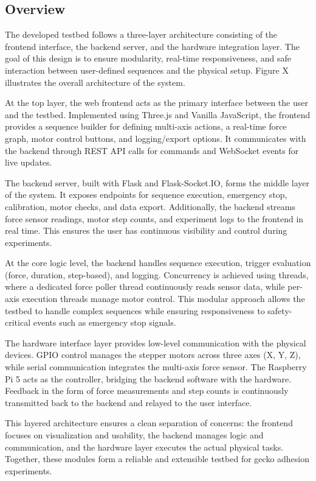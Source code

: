 \documentclass[
    twocolumn,
    fontsize = 10pt,
    parskip = half+,
    headings = small,
    headwidth = text,
    footwidth = text,
]{scrartcl}
\begin{document}
\subsection{Overview}
The developed testbed follows a three-layer architecture consisting of the frontend interface, the backend server, and the hardware integration layer. The goal of this design is to ensure modularity, real-time responsiveness, and safe interaction between user-defined sequences and the physical setup. Figure X illustrates the overall architecture of the system.

At the top layer, the web frontend acts as the primary interface between the user and the testbed. Implemented using Three.js and Vanilla JavaScript, the frontend provides a sequence builder for defining multi-axis actions, a real-time force graph, motor control buttons, and logging/export options. It communicates with the backend through REST API calls for commands and WebSocket events for live updates.

The backend server, built with Flask and Flask-Socket.IO, forms the middle layer of the system. It exposes endpoints for sequence execution, emergency stop, calibration, motor checks, and data export. Additionally, the backend streams force sensor readings, motor step counts, and experiment logs to the frontend in real time. This ensures the user has continuous visibility and control during experiments.

At the core logic level, the backend handles sequence execution, trigger evaluation (force, duration, step-based), and logging. Concurrency is achieved using threads, where a dedicated force poller thread continuously reads sensor data, while per-axis execution threads manage motor control. This modular approach allows the testbed to handle complex sequences while ensuring responsiveness to safety-critical events such as emergency stop signals.

The hardware interface layer provides low-level communication with the physical devices. GPIO control manages the stepper motors across three axes (X, Y, Z), while serial communication integrates the multi-axis force sensor. The Raspberry Pi 5 acts as the controller, bridging the backend software with the hardware. Feedback in the form of force measurements and step counts is continuously transmitted back to the backend and relayed to the user interface.

This layered architecture ensures a clean separation of concerns: the frontend focuses on visualization and usability, the backend manages logic and communication, and the hardware layer executes the actual physical tasks. Together, these modules form a reliable and extensible testbed for gecko adhesion experiments. 
\end{document}
